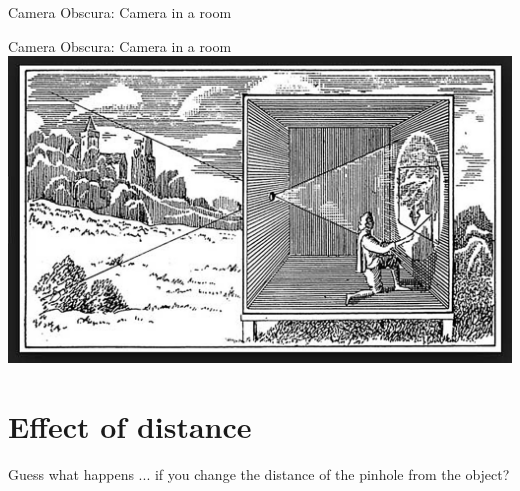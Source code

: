 \begin{frame}{Camera Obscura: Camera in a room}
\end{frame}

\begin{frame}{Camera Obscura: Camera in a room}
  \centering
  \includegraphics[width=\textwidth]{media/camera_ina_room.jpg}
\end{frame}

\section{Effect of distance}
\begin{frame}{Guess what happens}
  ... if you change the distance of the pinhole from the object?
\end{frame}

